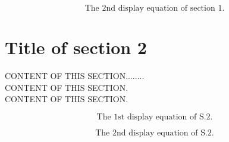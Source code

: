 \documentclass[10pt]{book}
\theoremstyle{definition}
\begin{document}
\begin{equation}
\mbox {The 2nd display equation of section 1.}
\end{equation}

\section{Title of section 2}
\setcounter{equation}{0}

CONTENT OF THIS SECTION........\\
CONTENT OF THIS SECTION.\\
CONTENT OF THIS SECTION.\\
\par

\begin{equation}
\mbox {The 1st display equation of S.2.}
\end{equation}

\begin{equation}
\mbox {The 2nd display equation of S.2.}
\end{equation}

\newpage
\lhead[\footnotesize\thepage\fancyplain{}\leftmark]{}\rhead[]{\fancyplain{}\rightmark\footnotesize\thepage}%
\end{document}
